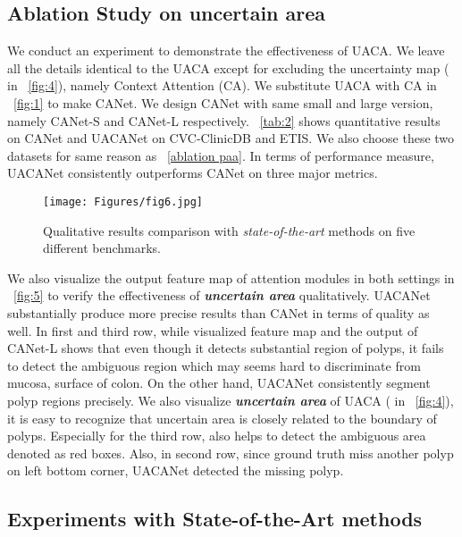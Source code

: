 \documentclass[sigconf]{acmart}
\begin{document}
\subsection{Ablation Study on uncertain area}

We conduct an experiment to demonstrate the effectiveness of UACA. We leave all the details identical to the UACA except for excluding the uncertainty map ( in \figureautorefname~\ref{fig:4}), namely Context Attention (CA). We substitute UACA with CA in \figureautorefname~\ref{fig:1} to make CANet. We design CANet with same small and large version, namely CANet-S and CANet-L respectively. \tableautorefname~\ref{tab:2} shows quantitative results on CANet and UACANet on CVC-ClinicDB and ETIS. We also choose these two datasets for same reason as \sectionautorefname~\ref{ablation paa}. In terms of performance measure, UACANet consistently outperforms CANet on three major metrics. 

\begin{figure*}[]
  \centering
  \texttt{[image: Figures/fig6.jpg]}
  \caption{Qualitative results comparison with \textit{state-of-the-art} methods on five different benchmarks.}
    \label{fig:6}
\end{figure*}

We also visualize the output feature map of attention modules in both settings in \figureautorefname~\ref{fig:5} to verify the effectiveness of \textbf{\textit{uncertain area}} qualitatively. UACANet substantially produce more precise results than CANet in terms of quality as well. In first and third row, while visualized feature map and the output of CANet-L shows that even though it detects substantial region of polyps, it fails to detect the ambiguous region which may seems hard to discriminate from mucosa, surface of colon. On the other hand, UACANet consistently segment polyp regions precisely. We also visualize \textbf{\textit{uncertain area}} of UACA ( in \figureautorefname~\ref{fig:4}), it is easy to recognize that uncertain area is closely related to the boundary of polyps. Especially for the third row,  also helps to detect the ambiguous area denoted as red boxes. Also, in second row, since ground truth miss another polyp on left bottom corner, UACANet detected the missing polyp. 

\subsection{Experiments with State-of-the-Art methods}
\end{document}
